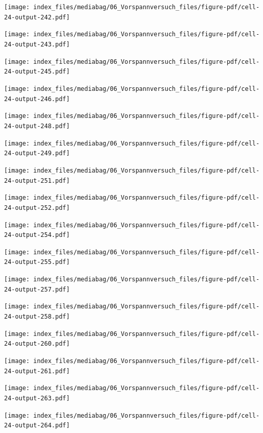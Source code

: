 \documentclass[
  11pt,
  letterpaper,
]{scrreprt}
\begin{document}
\newpage{}

\texttt{[image: index\_files/mediabag/06\_Vorspannversuch\_files/figure-pdf/cell-24-output-242.pdf]}

\texttt{[image: index\_files/mediabag/06\_Vorspannversuch\_files/figure-pdf/cell-24-output-243.pdf]}

\newpage{}

\texttt{[image: index\_files/mediabag/06\_Vorspannversuch\_files/figure-pdf/cell-24-output-245.pdf]}

\texttt{[image: index\_files/mediabag/06\_Vorspannversuch\_files/figure-pdf/cell-24-output-246.pdf]}

\newpage{}

\texttt{[image: index\_files/mediabag/06\_Vorspannversuch\_files/figure-pdf/cell-24-output-248.pdf]}

\texttt{[image: index\_files/mediabag/06\_Vorspannversuch\_files/figure-pdf/cell-24-output-249.pdf]}

\newpage{}

\texttt{[image: index\_files/mediabag/06\_Vorspannversuch\_files/figure-pdf/cell-24-output-251.pdf]}

\texttt{[image: index\_files/mediabag/06\_Vorspannversuch\_files/figure-pdf/cell-24-output-252.pdf]}

\newpage{}

\texttt{[image: index\_files/mediabag/06\_Vorspannversuch\_files/figure-pdf/cell-24-output-254.pdf]}

\texttt{[image: index\_files/mediabag/06\_Vorspannversuch\_files/figure-pdf/cell-24-output-255.pdf]}

\newpage{}

\texttt{[image: index\_files/mediabag/06\_Vorspannversuch\_files/figure-pdf/cell-24-output-257.pdf]}

\texttt{[image: index\_files/mediabag/06\_Vorspannversuch\_files/figure-pdf/cell-24-output-258.pdf]}

\newpage{}

\texttt{[image: index\_files/mediabag/06\_Vorspannversuch\_files/figure-pdf/cell-24-output-260.pdf]}

\texttt{[image: index\_files/mediabag/06\_Vorspannversuch\_files/figure-pdf/cell-24-output-261.pdf]}

\newpage{}

\texttt{[image: index\_files/mediabag/06\_Vorspannversuch\_files/figure-pdf/cell-24-output-263.pdf]}

\texttt{[image: index\_files/mediabag/06\_Vorspannversuch\_files/figure-pdf/cell-24-output-264.pdf]}
\end{document}
